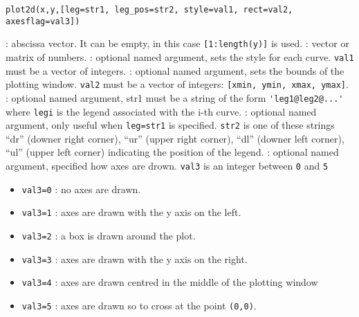 
\begin{mandesc}
\end{mandesc}

\begin{calling_sequence}
\begin{verbatim}
plot2d(x,y,[leg=str1, leg_pos=str2, style=val1, rect=val2, axesflag=val3])
\end{verbatim}
\end{calling_sequence}
\begin{parameters}
  \begin{varlist}
     : abscissa vector. It can be empty, in this case \verb+[1:length(y)]+ is used.
     : vector or matrix of numbers.
     : optional named argument, sets the style for each curve. \verb+val1+
    must be a vector of integers.
     : optional named argument, sets the bounds of the plotting
    window. \verb+val2+ must be a vector of integers: \verb+[xmin, ymin, xmax, ymax]+.
     : optional named argument, str1 must be a string of the form
    \verb+'leg1@leg2@...'+ where \verb+legi+ is the legend associated with the i-th curve.
     : optional named argument, only useful when \verb+leg=str1+
    is specified. \verb+str2+ is one of these strings ``dr'' (downer right corner), ``ur'' (upper
    right corner), ``dl'' (downer left corner), ``ul'' (upper left corner)
    indicating the position of the legend.
     : optional named argument, specified how axes are
    drown. \verb+val3+ is an integer between \verb+0+ and \verb+5+
    \begin{itemize}
    \item \verb+val3=0+ : no axes are drawn.
    \item \verb+val3=1+ : axes are drawn with the y axis on the left.
    \item \verb+val3=2+ : a box is drawn around the plot.
    \item \verb+val3=3+ : axes are drawn with the y axis on the right.
    \item \verb+val3=4+ : axes are drawn centred in the middle of the plotting window
    \item \verb+val3=5+ : axes are drawn so to cross at the point \verb+(0,0)+.
    \end{itemize}
  \end{varlist}
\end{parameters}

